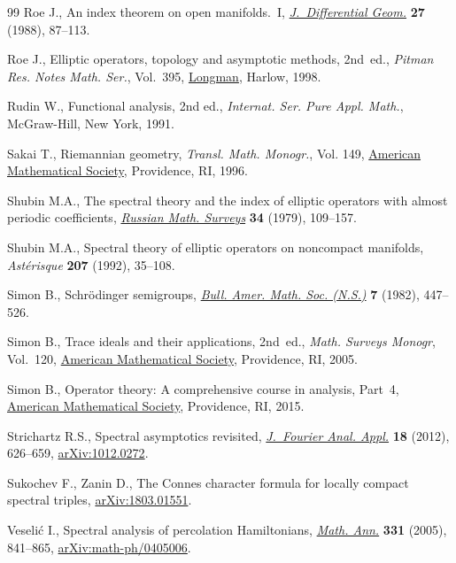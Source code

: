 \documentclass[pdftex]{sigma}
\numberwithin{equation}{section}
\begin{document}
\begin{thebibliography}{99}
Roe J., An index theorem on open manifolds.~{I}, \href{https://doi.org/10.4310/jdg/1214441652}{\textit{J.~Differential Geom.}}
 \textbf{27} (1988), 87--113.

Roe J., Elliptic operators, topology and asymptotic methods, 2nd~ed., \textit{Pitman
 Res. Notes Math. Ser.}, Vol.~395, \href{https://doi.org/10.1201/b16418}{Longman}, Harlow, 1998.

Rudin W., Functional analysis, 2nd ed., \textit{Internat. Ser. Pure Appl. Math.},
 McGraw-Hill, New York, 1991.

Sakai T., Riemannian geometry, \textit{Transl. Math. Monogr.}, Vol. 149,
 \href{https://doi.org/10.1090/mmono/149}{American Mathematical Society}, Providence, RI, 1996.

Shubin M.A., The spectral theory and the index of elliptic operators with
 almost periodic coefficients, \href{https://doi.org/10.1070/RM1979v034n02ABEH002908}{\textit{Russian Math. Surveys}} \textbf{34}
 (1979), 109--157.

Shubin M.A., Spectral theory of elliptic operators on noncompact manifolds,
 \textit{Ast\'erisque} \textbf{207} (1992), 35--108.

Simon B., Schr\"odinger semigroups, \href{https://doi.org/10.1090/S0273-0979-1982-15041-8}{\textit{Bull. Amer. Math. Soc. (N.S.)}}
 \textbf{7} (1982), 447--526.

Simon B., Trace ideals and their applications, 2nd~ed., \textit{Math. Surveys Monogr},
 Vol.~120, \href{https://doi.org/10.1090/surv/120}{American Mathematical Society}, Providence, RI, 2005.

Simon B., Operator theory: {A} comprehensive course in analysis, {P}art~4,
 \href{https://doi.org/10.1090/simon/004}{American Mathematical Society}, Providence, RI, 2015.

Strichartz R.S., Spectral asymptotics revisited, \href{https://doi.org/10.1007/s00041-012-9216-7}{\textit{J.~Fourier Anal.
 Appl.}} \textbf{18} (2012), 626--659, \href{https://arxiv.org/abs/1012.0272}{arXiv:1012.0272}.

Sukochev F., Zanin D., The {C}onnes character formula for locally compact
 spectral triples, \href{https://arxiv.org/abs/1803.01551}{arXiv:1803.01551}.

Veseli\'c I., Spectral analysis of percolation {H}amiltonians, \href{https://doi.org/10.1007/s00208-004-0610-6}{\textit{Math.
 Ann.}} \textbf{331} (2005), 841--865, \href{https://arxiv.org/abs/math-ph/0405006}{arXiv:math-ph/0405006}.


\end{thebibliography}
\end{document}

